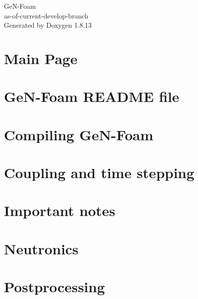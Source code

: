 \documentclass[twoside]{book}
\newcommand{\+}{\discretionary{\mbox{\scriptsize$\hookleftarrow$}}{}{}}
\newcommand{\clearemptydoublepage}{%
  \newpage{\pagestyle{empty}\cleardoublepage}%
}
\begin{document}
\hypersetup{pageanchor=false,
             bookmarksnumbered=true,
             pdfencoding=unicode
            }
\begin{titlepage}
\vspace*{7cm}
\begin{center}%
{\Large Ge\+N-\/\+Foam \\[1ex]\large as-\/of-\/current-\/develop-\/branch }\\
\vspace*{1cm}
{\large Generated by Doxygen 1.8.13}\\
\end{center}
\end{titlepage}
\clearemptydoublepage
{}
\tableofcontents
\clearemptydoublepage
{}
\hypersetup{pageanchor=true}

\chapter{Main Page}
\label{index}\hypertarget{index}{}
\chapter{Ge\+N-\/\+Foam R\+E\+A\+D\+ME file}
\label{README}

\chapter{Compiling Ge\+N-\/\+Foam}
\label{COMPILE}

\chapter{Coupling and time stepping}
\label{COUPLING}

\chapter{Important notes}
\label{NOTES}

\chapter{Neutronics}
\label{NEUTRONICS}

\chapter{Postprocessing}
\label{POSTPROCESSING}

\end{document}
